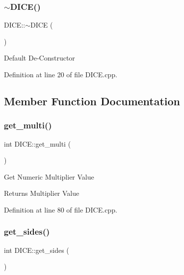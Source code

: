\mbox{\label{class_d_i_c_e_ad543253cd88143c29ea51716a09444e5}} 
\subsubsection{\texorpdfstring{$\sim$DICE()}{~DICE()}}
{\footnotesize\ttfamily D\+I\+C\+E\+::$\sim$\+D\+I\+CE (\begin{DoxyParamCaption}{ }\end{DoxyParamCaption})}



Default De-\/\+Constructor 



Definition at line 20 of file D\+I\+C\+E.\+cpp.



\subsection{Member Function Documentation}
\mbox{\label{class_d_i_c_e_aa9ba66c4289c2facf5946fcf1b0017b2}} 
\subsubsection{\texorpdfstring{get\_multi()}{get\_multi()}}
{\footnotesize\ttfamily int D\+I\+C\+E\+::get\+\_\+multi (\begin{DoxyParamCaption}{ }\end{DoxyParamCaption})}



Get Numeric Multiplier Value 

\begin{DoxyReturn}{Returns}
Multiplier Value
\end{DoxyReturn}


Definition at line 80 of file D\+I\+C\+E.\+cpp.

\mbox{\label{class_d_i_c_e_a6b6c5219c27de25a2b33a2c7dd432948}} 
\subsubsection{\texorpdfstring{get\_sides()}{get\_sides()}}
{\footnotesize\ttfamily int D\+I\+C\+E\+::get\+\_\+sides (\begin{DoxyParamCaption}{ }\end{DoxyParamCaption})}



